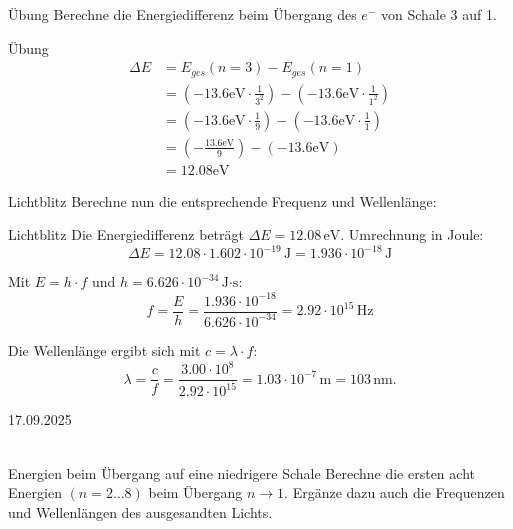 \documentclass[11pt,a4paper,oneside]{article}
\newcommand{\lessondate}[1]{\noindent\hfill\textcolor{MarginalGray}{\textsc{#1}} \\ \vspace{0.5cm}}
\begin{document}
	\newpage
	\begin{aufgabe}{Übung}
		Berechne die Energiedifferenz beim Übergang des $e^{-}$ von Schale 3 auf 1. 
	\end{aufgabe}
	
	\begin{loesung}{Übung}
		\begin{align*}
			\Delta E &= E_{ges} (n = 3) - E_{ges} (n = 1)\\
			&= \left( -13.6 \mathrm{eV} \cdot \frac{1}{3^2}\right) - \left( -13.6 \mathrm{eV} \cdot \frac{1}{1^2}\right)\\ 
			&= \left( -13.6 \mathrm{eV} \cdot \frac{1}{9}\right) - \left( -13.6 \mathrm{eV} \cdot \frac{1}{1}\right)\\ 
			&= \left( - \frac{13.6 \mathrm{eV}}{9}\right) - \left( - 13.6 \mathrm{eV} \right)\\
			&= 12.08 \mathrm{eV}
		\end{align*}
	\end{loesung}
	
	\begin{aufgabe}{Lichtblitz}
		Berechne nun die entsprechende Frequenz und Wellenlänge: 
	\end{aufgabe}
	
	\begin{loesung}{Lichtblitz}
		Die Energiedifferenz beträgt $\Delta E = 12.08\,\text{eV}$.  
		Umrechnung in Joule:
		\[
		\Delta E = 12.08 \cdot 1.602 \cdot 10^{-19}\,\text{J}
		= 1.936 \cdot 10^{-18}\,\text{J}
		\]
		
		Mit $E = h \cdot f$ und $h = 6.626 \cdot 10^{-34}\,\text{J·s}$:
		\[
		f = \frac{E}{h} = \frac{1.936 \cdot 10^{-18}}{6.626 \cdot 10^{-34}}
		= 2.92 \cdot 10^{15}\,\text{Hz}
		\]
		
		Die Wellenlänge ergibt sich mit $c = \lambda \cdot f$:
		\[
		\lambda = \frac{c}{f} = \frac{3.00 \cdot 10^8}{2.92 \cdot 10^{15}}
		= 1.03 \cdot 10^{-7}\,\text{m} = 103\,\text{nm}.
		\]
	\end{loesung}
	
	\newpage
	
	\lessondate{17.09.2025}\\
	\vspace{-10mm}
	\begin{aufgabe}{Energien beim Übergang auf eine niedrigere Schale}
		Berechne die ersten acht Energien $(n=2\dots 8)$ beim Übergang $n \to 1$. 
		Ergänze dazu auch die Frequenzen und Wellenlängen des ausgesandten Lichts.
	\end{aufgabe}
	
\end{document}
